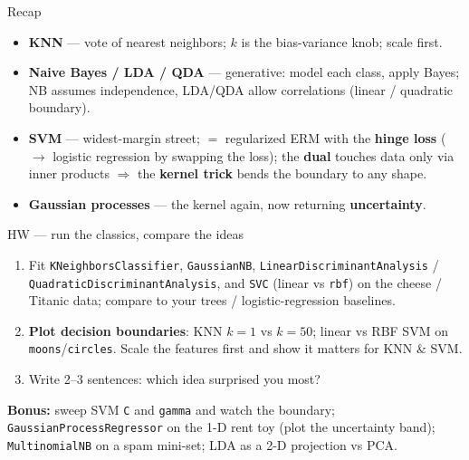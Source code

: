 \documentclass[aspectratio=169]{beamer}
\begin{document}
\begin{frame}{Recap}
  \begin{itemize}\small
    \item \textbf{KNN} --- vote of nearest neighbors; $k$ is the bias-variance knob; scale first.
    \item \textbf{Naive Bayes / LDA / QDA} --- generative: model each class, apply Bayes; NB
      assumes independence, LDA/QDA allow correlations (linear / quadratic boundary).
    \item \textbf{SVM} --- widest-margin street; $=$ regularized ERM with the \textbf{hinge loss}
      ($\to$ logistic regression by swapping the loss); the \textbf{dual} touches data only via
      inner products $\Rightarrow$ the \textbf{kernel trick} bends the boundary to any shape.
    \item \textbf{Gaussian processes} --- the kernel again, now returning \textbf{uncertainty}.
  \end{itemize}
  \vfill
\end{frame}

\begin{frame}{HW --- run the classics, compare the ideas}
  \begin{enumerate}\small
    \item Fit \texttt{KNeighborsClassifier}, \texttt{GaussianNB},
      \texttt{LinearDiscriminantAnalysis} / \texttt{QuadraticDiscriminantAnalysis}, and
      \texttt{SVC} (linear vs \texttt{rbf}) on the cheese / Titanic data; compare to your
      trees / logistic-regression baselines.
    \item \textbf{Plot decision boundaries}: KNN $k=1$ vs $k=50$; linear vs RBF SVM on
      \texttt{moons}/\texttt{circles}. Scale the features first and show it matters for KNN \& SVM.
    \item Write 2--3 sentences: which idea surprised you most?
  \end{enumerate}
  \vskip 2pt
  \textbf{Bonus:} sweep SVM \texttt{C} and \texttt{gamma} and watch the boundary;
  \texttt{GaussianProcessRegressor} on the 1-D rent toy (plot the uncertainty band);
  \texttt{MultinomialNB} on a spam mini-set; LDA as a 2-D projection vs PCA.
\end{frame}
\end{document}
